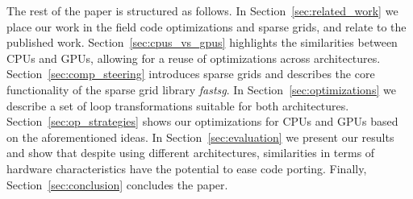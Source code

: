 The rest of the paper is structured as follows. In
Section~\ref{sec:related_work} we place our work in the field code optimizations
and sparse grids, and relate to the published work.
Section~\ref{sec:cpus_vs_gpus} highlights the similarities between CPUs and
GPUs, allowing for a reuse of optimizations across architectures.
Section~\ref{sec:comp_steering} introduces sparse grids and describes the core
functionality of the sparse grid library \textit{fastsg}. In
Section~\ref{sec:optimizations} we describe a set of loop transformations
suitable for both architectures. Section~\ref{sec:op_strategies} shows our
optimizations for CPUs and GPUs based on the aforementioned ideas. In
Section~\ref{sec:evaluation} we present our results and show that despite using
different architectures, similarities in terms of hardware characteristics have
the potential to ease code porting. Finally, Section~\ref{sec:conclusion}
concludes the paper.
